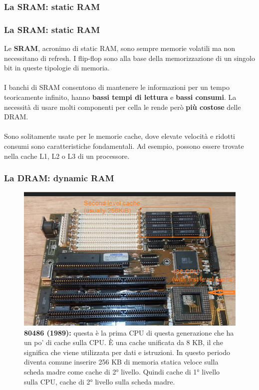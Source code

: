 \subsubsection[La SRAM: static RAM]{La SRAM: static RAM}
\begin{frame}
	\frametitle{La SRAM: static RAM}
	  
	\begin{block}{}
		Le \textbf{SRAM}, acronimo di static RAM, sono sempre memorie volatili ma non necessitano di refresh. I flip-flop sono alla base della memorizzazione di un singolo bit in queste tipologie di memoria.\\~\\
		I banchi di SRAM consentono di mantenere le informazioni per un tempo teoricamente infinito, hanno \textbf{bassi tempi di lettura} e \textbf{bassi consumi}. La necessità di usare molti componenti per cella le rende però \textbf{più costose} delle DRAM.\\~\\
		Sono solitamente usate per le memorie cache, dove elevate velocità e ridotti consumi sono caratteristiche fondamentali. Ad esempio, possono essere trovate nella cache L1, L2 o L3 di un processore.
		
	\end{block}
\end{frame}


\begin{frame}
	\frametitle{La DRAM: dynamic RAM}
	 
	\begin{figure}[!htbp] 
		\centering
		\includegraphics[width=0.62\linewidth]{images/5_memory/cache_1.png}
		\caption{\textbf{80486 (1989):} questa è la prima CPU di questa generazione che ha un po' di cache sulla CPU. È una cache unificata da 8 KB, il che significa che viene utilizzata per dati e istruzioni. In questo periodo diventa comune inserire 256 KB di memoria statica veloce sulla scheda madre come cache di 2° livello. Quindi cache di 1° livello sulla CPU, cache di 2° livello sulla scheda madre.}
	\end{figure}
	
\end{frame}


